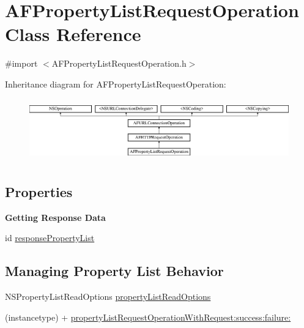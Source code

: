 \hypertarget{interface_a_f_property_list_request_operation}{\section{A\-F\-Property\-List\-Request\-Operation Class Reference}
\label{interface_a_f_property_list_request_operation}
}


{\ttfamily \#import $<$A\-F\-Property\-List\-Request\-Operation.\-h$>$}

Inheritance diagram for A\-F\-Property\-List\-Request\-Operation\-:\begin{figure}[H]
\begin{center}
\leavevmode
\includegraphics[height=2.731707cm]{interface_a_f_property_list_request_operation}
\end{center}
\end{figure}
\subsection*{Properties}
\begin{Indent}{\bf Getting Response Data}\par
{\em 

 

 }\begin{DoxyCompactItemize}
\item 
id \hyperlink{interface_a_f_property_list_request_operation_aa58eb95915eb6912569d6b3a97d5ee97}{response\-Property\-List}
\end{DoxyCompactItemize}
\end{Indent}
\subsection*{Managing Property List Behavior}
\label{_amgrpe5daaa0afd5161f38f34cebf2ae09bff}%


 

 \begin{DoxyCompactItemize}
\item 
N\-S\-Property\-List\-Read\-Options \hyperlink{interface_a_f_property_list_request_operation_a5fb606d19d4b174a207a695132f97f59}{property\-List\-Read\-Options}
\item 
(instancetype) + \hyperlink{interface_a_f_property_list_request_operation_adf02eda1ebd291a389010c3792e23d7f}{property\-List\-Request\-Operation\-With\-Request\-:success\-:failure\-:}
\end{DoxyCompactItemize}
